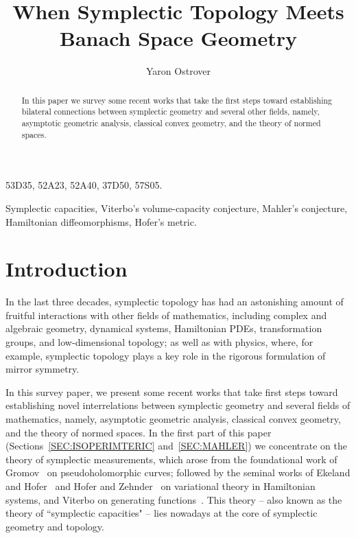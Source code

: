 \documentclass{icmart}
\title[When Symplectic Topology Meets  Banach Space Geometry]{When  Symplectic Topology Meets  Banach Space Geometry}
\author[Yaron Ostrover]
{Yaron Ostrover
}
\theoremstyle{definition}
\begin{document}
\begin{abstract}
In this paper we survey some recent 
works that take the first steps toward establishing  
bilateral connections between symplectic geometry and 
several other fields, namely,  asymptotic geometric analysis, classical convex geometry, and the theory of normed spaces. 

\end{abstract}

\begin{classification} 53D35,  52A23, 52A40, 37D50, 57S05.
\end{classification}

\begin{keywords}
Symplectic capacities, Viterbo's volume-capacity conjecture, %
Mahler's conjecture, Hamiltonian diffeomorphisms, Hofer's metric. 
\end{keywords}

\maketitle

\section{Introduction}


 In the last three decades, 
symplectic topology has had an astonishing amount of  fruitful interactions with other fields of mathematics, including complex and algebraic geometry,  dynamical systems, 
Hamiltonian PDEs, transformation groups, 
and low-dimensional topology; 
as well as with physics, where, for example, symplectic topology plays a key role in the  rigorous formulation of mirror symmetry. 

\smallskip

In this survey paper, we present some recent works that take first steps toward establishing novel interrelations between symplectic geometry and 
several fields of mathematics, %
namely, asymptotic geometric analysis, classical convex geometry,  and the theory of normed spaces. 
In the first part of this paper (Sections~\ref{SEC:ISOPERIMTERIC} and~\ref{SEC:MAHLER}) we concentrate on the theory of symplectic measurements, 
which arose from the foundational work of Gromov~\cite{Gr} on pseudoholomorphic curves;  followed by the seminal works of Ekeland and Hofer~\cite{EH} and Hofer and Zehnder~\cite{HZ1} on variational theory 
in Hamiltonian systems, and Viterbo on generating  functions~\cite{V1}. This theory -- also known as the theory of ``symplectic capacities" -- lies nowadays at the core of symplectic geometry and topology.
\end{document}

